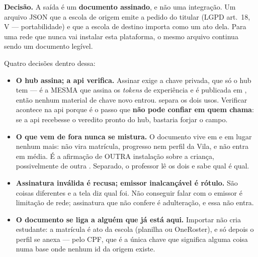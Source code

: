 \textbf{Decisão.} A saída é um \textbf{documento assinado}, e não uma integração.
Um arquivo JSON  que a escola de origem emite a
pedido do titular (LGPD art.~18, V --- portabilidade) e que a escola de destino
importa como um ato dela. Para uma rede que nunca vai instalar esta plataforma, o
mesmo arquivo continua sendo um documento legível.

Quatro decisões dentro dessa:

\begin{itemize}
  \item \textbf{O hub assina; a api verifica.} Assinar exige a chave privada, que
    só o hub tem --- é a MESMA que assina os \emph{tokens} de experiência e é
    publicada em , então nenhum material de chave
    novo entrou.  separa os dois usos. Verificar
    acontece na api porque é o passo que \textbf{não pode confiar em quem chama}:
    se a api recebesse o veredito pronto do hub, bastaria forjar o campo.
  \item \textbf{O que vem de fora nunca se mistura.} O documento vive em
     e em lugar nenhum mais: não vira matrícula, progresso
    nem perfil da Vila, e não entra em média. É a afirmação de OUTRA instalação
    sobre a criança, possivelmente de outra . Separado, o
    professor lê os dois e sabe qual é qual.
  \item \textbf{Assinatura inválida é recusa; emissor inalcançável é rótulo.} São
    coisas diferentes e a tela diz qual foi. Não conseguir falar com o emissor é
    limitação de rede; assinatura que não confere é adulteração, e essa não entra.
  \item \textbf{O documento se liga a alguém que já está aqui.} Importar não cria
    estudante: a matrícula é ato da escola (planilha ou OneRoster), e só depois o
    perfil se anexa --- pelo CPF, que é a única chave que significa alguma coisa
    numa base onde nenhum id da origem existe.
\end{itemize}

